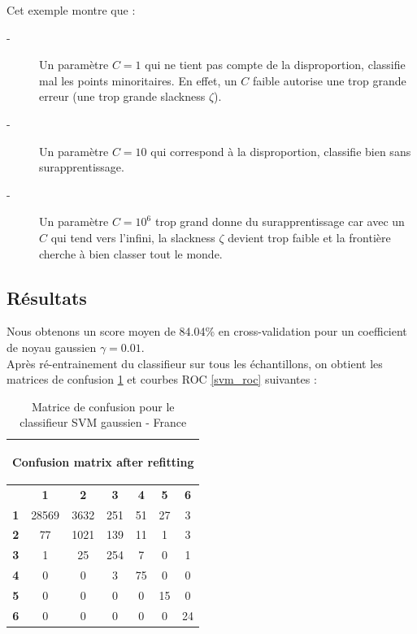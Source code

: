 \documentclass{book}
\begin{document}
Cet exemple montre que :
\begin{description}
 \item[-] Un paramètre $C=1$ qui ne tient pas compte de la disproportion, classifie mal les points minoritaires. En effet, un $C$ faible autorise une trop grande erreur (une trop grande \og slackness \fg{} $\zeta$).
 \item[-] Un paramètre $C=10$ qui correspond à la disproportion, classifie bien sans surapprentissage.
 \item[-] Un paramètre $C=10^6$ trop grand donne du surapprentissage car avec un $C$ qui tend vers l'infini, la \og slackness \fg{}  $\zeta$ devient trop faible et la frontière cherche à bien classer tout le monde.
\end{description}
 
\subsection{Résultats}

Nous obtenons un score moyen de 84.04\% en cross-validation pour un coefficient de noyau gaussien $\gamma = 0.01$. \\
Après ré-entrainement du classifieur sur tous les échantillons, on obtient les matrices de confusion \ref{svm_cm} et courbes ROC \ref{svm_roc} suivantes :

\begin{table}[H]
  \begin{center}
\begin{adjustbox}{max width=\textwidth}
  \begin{tabular}{|c|c|c|c|c|c|c|}
    \hline
    \multicolumn{7}{|c|}{{ \begin{bf}Confusion matrix after refitting\end{bf}}} \\
    \hline
     & \textbf{1} & \textbf{2} & \textbf{3} & \textbf{4} & \textbf{5} & \textbf{6}\\
    \hline
    \textbf{1} & 28569 & 3632 & 251 & 51 & 27 & 3\\
    \hline
    \textbf{2} & 77 & 1021 & 139 & 11 & 1 & 3\\
    \hline
    \textbf{3} & 1 & 25 & 254 & 7 & 0 & 1\\
    \hline
    \textbf{4} & 0 & 0 & 3 & 75 & 0 & 0\\
    \hline
    \textbf{5} & 0 & 0 & 0 & 0 & 15 & 0\\
    \hline
    \textbf{6} & 0 & 0 & 0 & 0 & 0 & 24\\
    \hline
  \end{tabular}
  \end{adjustbox}
  \caption{Matrice de confusion pour le classifieur SVM gaussien - France}
  \label{svm_cm}
  \end{center}
\end{table}
\end{document}
